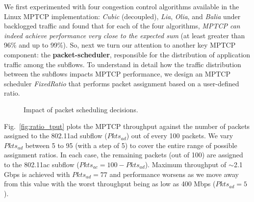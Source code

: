 We first experimented with four congestion control algorithms available in the
Linux MPTCP implementation: \emph{Cubic} (decoupled), \emph{Lia}, 
\emph{Olia}, and \emph{Balia} under backlogged
traffic and found that for each of the four algorithms, \textit{MPTCP can indeed achieve 
performance very close to the expected sum} (at least greater than 96\% and up to 99\%). So,
 next we turn our attention to another key MPTCP component: the \textbf{packet-scheduler},
responsible for the distribution of application traffic among the subflows. To understand in 
detail how the traffic distribution between the subflows impacts MPTCP performance, we 
design an MPTCP scheduler \emph{FixedRatio} that performs packet assignment based on
a user-defined ratio.

\begin{figure}[h]
    \centering
    \hfill
    \vspace{-0.15in}
    \caption{Impact of packet scheduling decisions.}
    \vspace{-0.1in}
\end{figure}

Fig.~\ref{fig:ratio_tput} plots the MPTCP throughput against the
number of packets assigned to the 802.11ad subflow ($Pkts_{ad}$) out
of every 100 packets. We vary $Pkts_{ad}$ between 5 to 95 (with a step
of 5) to cover the entire range of possible assignment ratios. In each
case, the remaining packets (out of 100) are assigned to the 802.11ac
subflow ($Pkts_{ac}=100-Pkts_{ad}$). Maximum throughput of $\sim$2.1
Gbps is achieved with $Pkts_{ad}=77$ and performance worsens as we
move away from this value with the worst throughput being as low as
400 Mbps ($Pkts_{ad}=5$).

